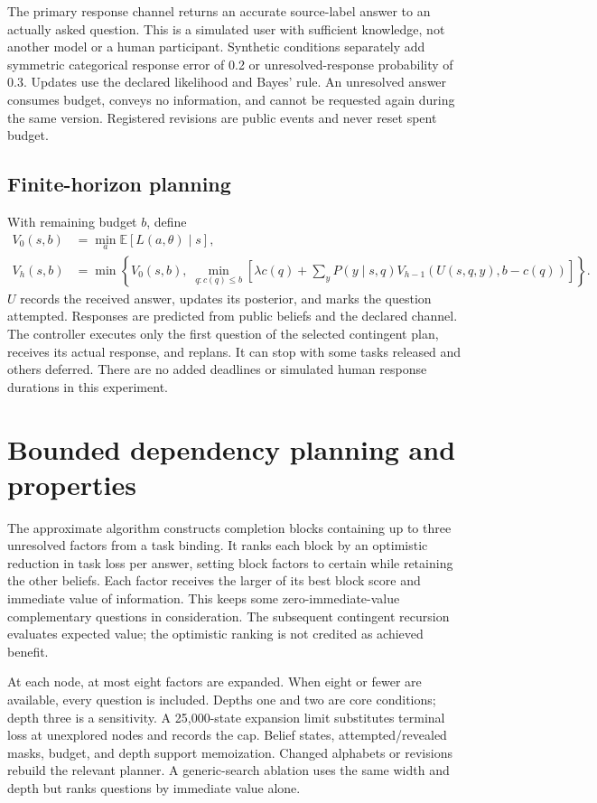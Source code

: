 \documentclass[11pt]{article}
\begin{document}
The primary response channel returns an accurate source-label answer to an actually asked question. This is a simulated user with sufficient knowledge, not another model or a human participant. Synthetic conditions separately add symmetric categorical response error of 0.2 or unresolved-response probability of 0.3. Updates use the declared likelihood and Bayes' rule. An unresolved answer consumes budget, conveys no information, and cannot be requested again during the same version. Registered revisions are public events and never reset spent budget.

\subsection{Finite-horizon planning}
With remaining budget $b$, define
\begin{align}
V_0(s,b)&=\min_a\mathbb{E}[L(a,\theta)\mid s],\\
V_h(s,b)&=\min\left\{V_0(s,b),\;\min_{q:c(q)\leq b}\left[\lambda c(q)+\sum_y P(y\mid s,q)V_{h-1}(U(s,q,y),b-c(q))\right]\right\}.
\end{align}
$U$ records the received answer, updates its posterior, and marks the question attempted. Responses are predicted from public beliefs and the declared channel. The controller executes only the first question of the selected contingent plan, receives its actual response, and replans. It can stop with some tasks released and others deferred. There are no added deadlines or simulated human response durations in this experiment.

\section{Bounded dependency planning and properties}
The approximate algorithm constructs completion blocks containing up to three unresolved factors from a task binding. It ranks each block by an optimistic reduction in task loss per answer, setting block factors to certain while retaining the other beliefs. Each factor receives the larger of its best block score and immediate value of information. This keeps some zero-immediate-value complementary questions in consideration. The subsequent contingent recursion evaluates expected value; the optimistic ranking is not credited as achieved benefit.

At each node, at most eight factors are expanded. When eight or fewer are available, every question is included. Depths one and two are core conditions; depth three is a sensitivity. A 25,000-state expansion limit substitutes terminal loss at unexplored nodes and records the cap. Belief states, attempted/revealed masks, budget, and depth support memoization. Changed alphabets or revisions rebuild the relevant planner. A generic-search ablation uses the same width and depth but ranks questions by immediate value alone.
\end{document}
